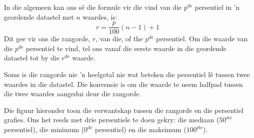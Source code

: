 In die algemeen kan ons sê die formule vir die vind van die $p^{\mathrm{de}}$ persentiel in ’n geordende datastel met $n$ waardes, is: 
\begin{equation*}
  r = \frac{p}{100}\left(n-1\right)+1
\end{equation*}
Dit gee vir ons die rangorde, $r$, van die, of the $p^{\mathrm{de}}$ persentiel. Om die waarde van die $p^{\mathrm{de}}$ persentiel te vind, tel ons vanaf die eerste waarde in die geordende datastel tot by die $r^{\mathrm{de}}$ waarde.

Soms is die rangorde nie ’n heelgetal nie wat beteken die persentiel lê tussen twee waardes in die datastel. Die konvensie is om die waarde te neem halfpad tussen die twee waardes aangedui deur die rangorde.

 Die figuur hieronder toon die verwantskap tussen die rangorde en die persentiel grafies. Ons het reeds met drie persentiele te doen gekry: die mediaan ($50^{\mathrm{ste}}$ persentiel), die minimum ($0^{\mathrm{de}}$ persentiel) en die maksimum ($100^{\mathrm{ste}}$).
\begin{center}
\end{center}


